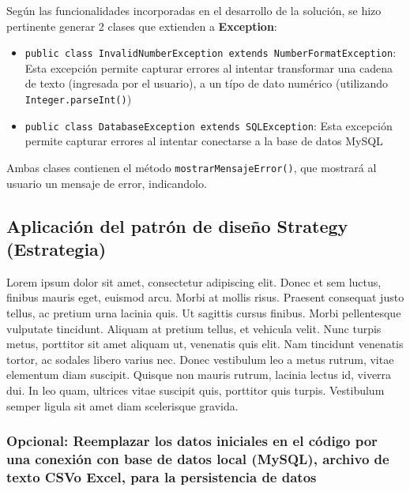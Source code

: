 Según las funcionalidades incorporadas en el desarrollo de la solución, se hizo pertinente generar 2 clases que extienden a \textbf{Exception}:

\begin{itemize}
    \item \texttt{public class InvalidNumberException extends NumberFormatException}: Esta excepción permite capturar errores al intentar transformar una cadena de texto (ingresada por el usuario), a un típo de dato numérico (utilizando \texttt{Integer.parseInt()})
    \item \texttt{public class DatabaseException extends SQLException}: Esta excepción permite capturar errores al intentar conectarse a la base de datos MySQL
\end{itemize}

Ambas clases contienen el método \texttt{mostrarMensajeError()}, que mostrará al usuario un mensaje de error, indicandolo.

\subsection{Aplicación del patrón de diseño Strategy (Estrategia)}

Lorem ipsum dolor sit amet, consectetur adipiscing elit. Donec et sem luctus, finibus mauris eget, euismod arcu. Morbi at mollis risus. Praesent consequat justo tellus, ac pretium urna lacinia quis. Ut sagittis cursus finibus. Morbi pellentesque vulputate tincidunt. Aliquam at pretium tellus, et vehicula velit. Nunc turpis metus, porttitor sit amet aliquam ut, venenatis quis elit. Nam tincidunt venenatis tortor, ac sodales libero varius nec. Donec vestibulum leo a metus rutrum, vitae elementum diam suscipit. Quisque non mauris rutrum, lacinia lectus id, viverra dui. In leo quam, ultrices vitae suscipit quis, porttitor quis turpis. Vestibulum semper ligula sit amet diam scelerisque gravida.

\subsubsection*{Opcional: Reemplazar los datos iniciales en el código por una conexión con base de datos local (MySQL), archivo de texto CSVo Excel, para la persistencia de datos}

